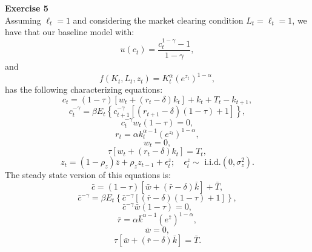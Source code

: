 \documentclass[letterpaper,12pt]{article}
\theoremstyle{definition}
\begin{document}
\noindent\textbf{Exercise 5}\\
Assuming $\ell_t=1$ and considering the market clearing condition $L_t=\ell_t=1$, we have that our baseline model with:
\[ u\left(c_{t}\right)=\frac{c_{t}^{1-\gamma}-1}{1-\gamma}, \]
and \[ f\left(K_{t}, L_{t}, z_{t}\right)=K_{t}^{\alpha}\left(e^{z_{t}}\right)^{1-\alpha}, \]
has the following characterizing equations:
\[ c_{t}=(1-\tau)\left[w_{t} +\left(r_{t}-\delta\right) k_{t}\right]+k_{t}+T_{t}-k_{t+1}, \]
\[ c_t^{-\gamma}=\beta E_{t}\left\{c_{t+1}^{-\gamma}\left[\left(r_{t+1}-\delta\right)(1-\tau)+1\right]\right\}, \]
\[ c_t^{-\gamma} w_{t}(1-\tau)=0, \]
\[ r_{t}=\alpha k_{t}^{\alpha-1}\left(e^{z_{t}}\right)^{1-\alpha}, \]
\[ w_{t}=0, \]
\[ \tau\left[w_{t}+\left(r_{t}-\delta\right) k_{t}\right]=T_{t}, \]
\[ z_{t}=\left(1-\rho_{z}\right) \overline{z}+\rho_{z} z_{t-1}+\epsilon_{t}^{z} ; \quad \epsilon_{t}^{z} \sim \text { i.i.d.}\left(0, \sigma_{z}^{2}\right). \]
The steady state version of this equations is:
\[ \bar{c}=(1-\tau)\left[\bar{w} +\left(\bar{r}-\delta\right) \bar{k}\right]+\bar{T}, \]
\[ \bar{c}^{-\gamma}=\beta E_{t}\left\{\bar{c}^{-\gamma}\left[\left(\bar{r}-\delta\right)(1-\tau)+1\right]\right\}, \]
\[ \bar{c}^{-\gamma} \bar{w}(1-\tau)=0, \]
\[ \bar{r}=\alpha \bar{k}^{\alpha-1}\left(e^{\bar{z}}\right)^{1-\alpha}, \]
\[ \bar{w}=0, \]
\[ \tau\left[\bar{w}+\left(\bar{r}-\delta\right) \bar{k}\right]=\bar{T}. \]
\end{document}
